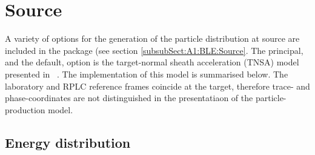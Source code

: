 \graphicspath{ {05-Source/Figures/} }

\section{Source}

A variety of options for the generation of the particle distribution
at source are included in the package (see
section \ref{subsubSect:A1:BLE:Source}.
The principal, and the default, option is the target-normal sheath
acceleration (TNSA) model presented in~\cite{10.1038/nphys199} .
The implementation of this model is summarised below.
The laboratory and RPLC reference frames coincide at the target,
therefore trace- and phase-coordinates are not distinguished in the
presentatiaon of the particle-production model.

\subsection{Energy distribution}


